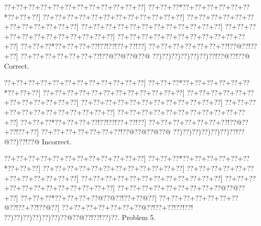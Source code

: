 \documentclass[a5paper]{article}
\begin{document}
\begin{center}
{\goo
\0??+\0??+\0??+\0??+\0??+\0??+\0??+\0??+\0??+\0??+\0??+\0??]
\0??+\0??+\0??*\0??+\0??+\0??+\0??+\0??+\0??*\0??+\0??+\0??]
\0??+\0??+\0??+\0??+\0??+\0??+\0??+\0??+\0??+\0??+\0??+\0??]
\0??+\0??+\0??+\0??+\0??+\0??+\0??+\0??+\0??+\0??+\0??+\0??]
\0??+\0??+\0??+\0??+\0??+\0??+\0??+\0??+\0??+\0??+\0??+\0??]
\0??+\0??+\0??+\0??+\0??+\0??+\0??+\0??+\0??+\0??+\0??+\0??]
\0??+\0??+\0??+\0??+\0??+\0??+\0??+\0??+\0??+\0??+\0??+\0??]
\0??+\0??+\0??*\0??+\0??+\0??+\0??!\0??!\0??!\0??+\0??!\0??]
\0??+\0??+\0??+\0??+\0??+\0??+\0??!\0??@\0??!\0??+\0??]
\0??+\0??+\0??+\0??+\0??+\0??+\0??!\0??@\0??@\0??@\0??@
\0??)\0??)\0??)\0??)\0??)\0??)\0??!\0??@\0??!\0??@
}
Correct. 

\end{center}
\begin{center}
{\goo
\0??+\0??+\0??+\0??+\0??+\0??+\0??+\0??+\0??+\0??+\0??+\0??]
\0??+\0??+\0??*\0??+\0??+\0??+\0??+\0??+\0??*\0??+\0??+\0??]
\0??+\0??+\0??+\0??+\0??+\0??+\0??+\0??+\0??+\0??+\0??+\0??]
\0??+\0??+\0??+\0??+\0??+\0??+\0??+\0??+\0??+\0??+\0??+\0??]
\0??+\0??+\0??+\0??+\0??+\0??+\0??+\0??+\0??+\0??+\0??+\0??]
\0??+\0??+\0??+\0??+\0??+\0??+\0??+\0??+\0??+\0??+\0??+\0??]
\0??+\0??+\0??+\0??+\0??+\0??+\0??+\0??+\0??+\0??+\0??+\0??]
\0??+\0??+\0??*\0??+\0??+\0??+\0??!\0??!\0??!\0??+\0??!\0??]
\0??+\0??+\0??+\0??+\0??+\0??+\0??!\0??@\0??+\0??!\0??+\0??]
\0??+\0??+\0??+\0??+\0??+\0??+\0??!\0??@\0??@\0??@\0??@
\0??)\0??)\0??)\0??)\0??)\0??)\0??!\0??@\0??)\0??!\0??@
}
Incorrect. 

\end{center}
\newpage
\begin{center}
{\goo
\0??+\0??+\0??+\0??+\0??+\0??+\0??+\0??+\0??+\0??+\0??+\0??]
\0??+\0??+\0??*\0??+\0??+\0??+\0??+\0??+\0??*\0??+\0??+\0??]
\0??+\0??+\0??+\0??+\0??+\0??+\0??+\0??+\0??+\0??+\0??+\0??]
\0??+\0??+\0??+\0??+\0??+\0??+\0??+\0??+\0??+\0??+\0??+\0??]
\0??+\0??+\0??+\0??+\0??+\0??+\0??+\0??+\0??+\0??+\0??+\0??]
\0??+\0??+\0??+\0??+\0??+\0??+\0??+\0??+\0??+\0??+\0??+\0??]
\0??+\0??+\0??+\0??+\0??+\0??+\0??+\0??+\0??@\0??@\0??+\0??]
\0??+\0??+\0??*\0??+\0??+\0??+\0??@\0??@\0??!\0??+\0??@\0??]
\0??+\0??+\0??+\0??+\0??+\0??+\0??@\0??!\0??+\0??!\0??@\0??]
\0??+\0??+\0??+\0??+\0??+\0??+\0??@\0??!\0??+\0??!\0??!\0??!
\0??)\0??)\0??)\0??)\0??)\0??)\0??@\0??@\0??!\0??!\0??)\0??.
}
Problem 5.

\end{center}
\end{document}
